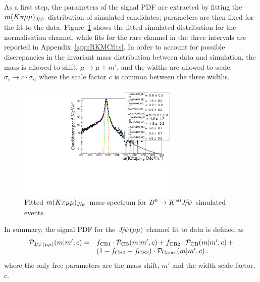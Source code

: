As a first step, the parameters of the signal PDF are extracted by fitting the $\mcKpimm_{\jpsi}$ distribution 
of \BdToKstJPsmm simulated candidates; parameters are then fixed for the fit to the data.
Figure~\ref{fig:mumu_MC_fits_main} shows the fitted simulated distribution for the normalisation channel, while
fits for the rare channel in the three \qsq intervals are reported in Appendix~\ref{app:RKMCfits}.
In order to account for possible discrepancies in the invariant mass distribution between data and simulation, 
the mass is allowed to shift, $\mu \rightarrow \mu +m'$, and the widths are allowed to scale, 
$\sigma_i \rightarrow c \cdot \sigma_i$, where the scale factor $c$ is common between the three widths.
%
\begin{figure}[h!]
\centering \includegraphics[width=0.7\textwidth]{RKst/figs/Fit/fit_MM/KstJPsMM_MC_log.pdf}
\caption{Fitted $m(K\pi \mu\mu)_{\jpsi}$ mass spectrum for $\Bz\to\Kstarz\jpsi$ simulated events. }
\label{fig:mumu_MC_fits_main}
\end{figure}
%
%

In summary, the signal PDF for the $\jpsi(\mu\mu)$ channel fit to data is defined as
%
\begin{equation*}
\begin{array}{rl}
\mathcal{P}_{\rm \jpsi(\mu\mu)}(m | m', c) = &
f_{\rm CB1} \cdot \mathcal{P}_{\rm CB}(m | m', c) + 
f_{\rm CB2} \cdot \mathcal{P}_{\rm CB}(m | m', c) \,+ \\ 
& (1 - f_{\rm CB1} -f_{\rm CB2}) \cdot \mathcal{P}_{\rm Gauss}(m | m', c) \, .$$
\end{array}
\end{equation*}
%
where the only free parameters are the mass shift, $m'$ and the width scale factor, $c$.


